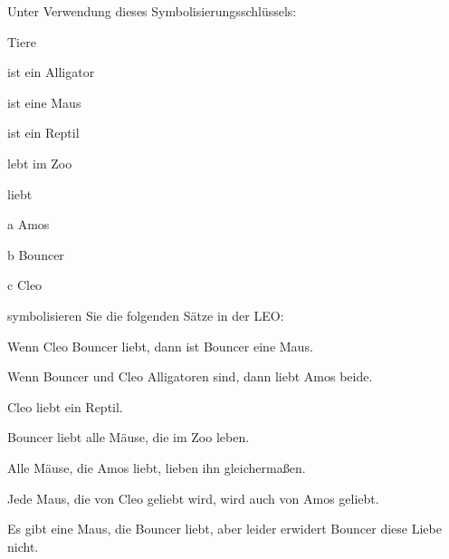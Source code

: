 \practiceproblems
\solutions
\problempart
Unter Verwendung dieses Symbolisierungsschlüssels:
\begin{ekey}
\item[\text{Domäne}] Tiere
\item[\atom{A}{x}]  ist ein Alligator
\item[\atom{M}{x}]  ist eine Maus
\item[\atom{R}{x}]  ist ein Reptil
\item[\atom{Z}{x}]  lebt im Zoo
\item[\atom{L}{x,y}]  liebt 
\item[a] Amos
\item[b] Bouncer
\item[c] Cleo
\end{ekey}
symbolisieren Sie die folgenden Sätze in der LEO:
\begin{earg}
\item Wenn Cleo Bouncer liebt, dann ist Bouncer eine Maus. 
\item Wenn Bouncer und Cleo Alligatoren sind, dann liebt Amos beide.
\item Cleo liebt ein Reptil.
\item Bouncer liebt alle Mäuse, die im Zoo leben.
\item Alle Mäuse, die Amos liebt, lieben ihn gleicherma{\ss}en.
\item Jede Maus, die von Cleo geliebt wird, wird auch von Amos geliebt.
\item Es gibt eine Maus, die Bouncer liebt, aber leider erwidert Bouncer diese Liebe nicht.
\end{earg}


